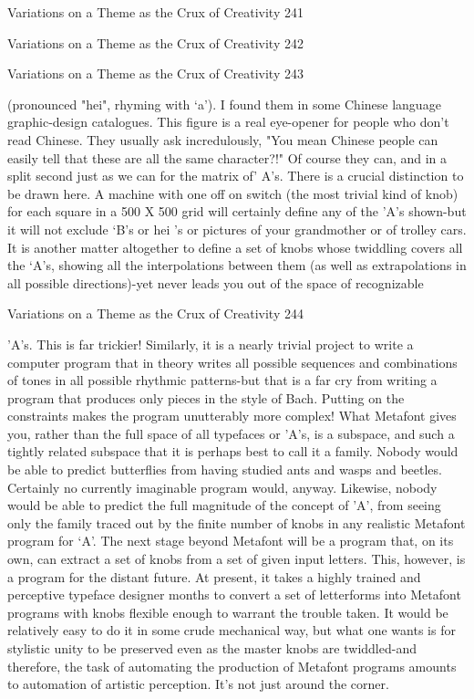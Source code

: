 Variations on a Theme as the Crux of Creativity                                     241

Variations on a Theme as the Crux of Creativity   242

Variations on a Theme as the Crux of Creativity   243

(pronounced "hei", rhyming with `a'). I found them in some Chinese language
graphic-design catalogues. This figure is a real eye-opener for people who don't read
Chinese. They usually ask incredulously, "You mean Chinese people can easily tell
that these are all the same character?!" Of course they can, and in a split second just
as we can for the matrix of' A's.
There is a crucial distinction to be drawn here. A machine with one off on switch (the
most trivial kind of knob) for each square in a 500 X 500 grid will certainly define
any of the 'A's shown-but it will not exclude `B's or hei 's or pictures of your
grandmother or of trolley cars. It is another matter altogether to define a set of knobs
whose twiddling covers all the `A's, showing all the interpolations between them (as
well as extrapolations in all possible directions)-yet never leads you out of the space
of recognizable




Variations on a Theme as the Crux of Creativity                                     244

'A's. This is far trickier! Similarly, it is a nearly trivial project to write a computer
program that in theory writes all possible sequences and combinations of tones in all
possible rhythmic patterns-but that is a far cry from writing a program that produces
only pieces in the style of Bach. Putting on the constraints makes the program
unutterably more complex!
        What Metafont gives you, rather than the full space of all typefaces or 'A's, is a
subspace, and such a tightly related subspace that it is perhaps best to call it a family.
Nobody would be able to predict butterflies from having studied ants and wasps and
beetles. Certainly no currently imaginable program would, anyway. Likewise, nobody
would be able to predict the full magnitude of the concept of 'A', from seeing only the
family traced out by the finite number of knobs in any realistic Metafont program for
`A'.
        The next stage beyond Metafont will be a program that, on its own, can extract
a set of knobs from a set of given input letters. This, however, is a program for the
distant future. At present, it takes a highly trained and perceptive typeface designer
months to convert a set of letterforms into Metafont programs with knobs flexible
enough to warrant the trouble taken. It would be relatively easy to do it in some crude
mechanical way, but what one wants is for stylistic unity to be preserved even as the
master knobs are twiddled-and therefore, the task of automating the production of
Metafont programs amounts to automation of artistic perception. It's not just around
the corner.

